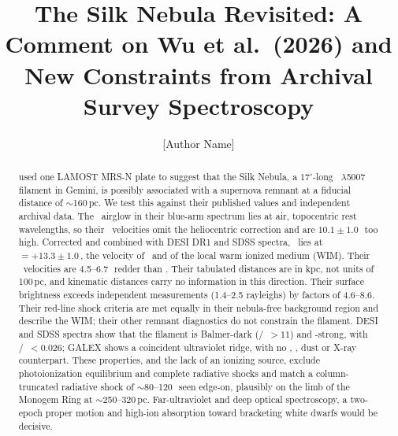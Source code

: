 \documentclass[twocolumn]{aastex631}
\begin{document}
\title{The Silk Nebula Revisited: A Comment on Wu et al.\ (2026) and New Constraints from Archival Survey Spectroscopy}

\author[0000-0000-0000-0000]{[Author Name]}

\begin{abstract}
\citet{Wu2026} used one LAMOST MRS-N plate to suggest that the Silk Nebula, a $17^\circ$-long \Oiii~$\lambda$5007 filament in Gemini, is possibly associated with a supernova remnant at a fiducial distance of $\sim$160\,pc. We test this against their published values and independent archival data. The \Ni\ airglow in their blue-arm spectrum lies at air, topocentric rest wavelengths, so their \Oiii\ velocities omit the heliocentric correction and are $10.1\pm1.0$\,\kms\ too high. Corrected and combined with DESI DR1 and SDSS spectra, \Oiii\ lies at \vhel\ $=+13.3\pm1.0$\,\kms, the velocity of \Nii\ and of the local warm ionized medium (WIM). Their \Ha\ velocities are 4.5--6.7\,\kms\ redder than \Nii. Their tabulated distances are in kpc, not units of 100\,pc, and kinematic distances carry no information in this direction. Their surface brightness exceeds independent measurements (1.4--2.5 rayleighs) by factors of 4.6--8.6. Their red-line shock criteria are met equally in their nebula-free background region and describe the WIM; their other remnant diagnostics do not constrain the filament. DESI and SDSS spectra show that the filament is Balmer-dark (\Oiii/\Hb\ $>11$) and \Oii-strong, with /\Oiii\ $<0.026$; GALEX shows a coincident ultraviolet ridge, with no \Ha, , dust or X-ray counterpart. These properties, and the lack of an ionizing source, exclude photoionization equilibrium and complete radiative shocks and match a column-truncated radiative shock of $\sim$80--120\,\kms\ seen edge-on, plausibly on the limb of the Monogem Ring at $\sim$250--320\,pc. Far-ultraviolet and deep optical spectroscopy, a two-epoch proper motion and high-ion absorption toward bracketing white dwarfs would be decisive.
\end{abstract}








\end{document}
